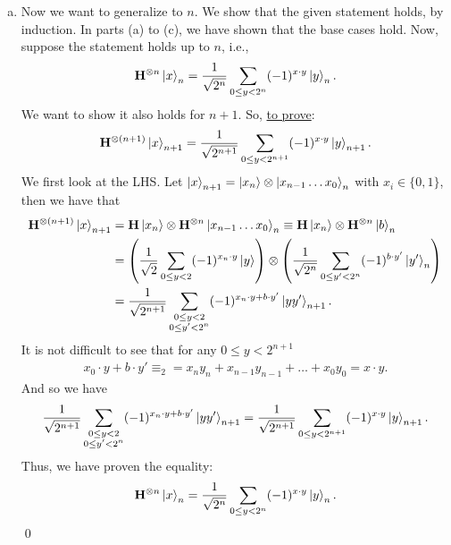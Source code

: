 \documentclass{book}
\theoremstyle{definition}
\newcommand{\nn}{\nonumber}
\newcommand{\f}[2]{\frac{#1}{#2}}
\newcommand{\lp}{\left(}
\newcommand{\rp}{\right)}
\newcommand{\had}{\mathbf{H}}
\begin{document}
\begin{enumerate}[(a)]
	
	
	\item Now we want to generalize to $n$. We show that the given statement holds, by induction. In parts (a) to (c), we have shown that the base cases hold. Now, suppose the statement holds up to $n$, i.e.,
	\begin{align}
	\had^{\otimes n}\ket{x}_n = \f{1}{\sqrt{2^n}} \sum_{0 \leq y < 2^n}(-1)^{x\cdot y}\ket{y}_n.
	\end{align}
	We want to show it also holds for $n+1$. So, \underline{to prove}:
	\begin{align}
	\had^{\otimes (n+1)}\ket{x}_{n+1} = \f{1}{\sqrt{2^{n+1}}} \sum_{0 \leq y < 2^{n+1}}(-1)^{x\cdot y}\ket{y}_{n+1}.
	\end{align}
	We first look at the LHS. Let $\ket{x}_{n+1} = \ket{x_n}\otimes \ket{x_{n-1}\dots x_0}_{n}$ with $x_i\in\{0,1\}$, then we have that
	\begin{align}
	\had^{\otimes (n+1)}\ket{x}_{n+1} &= \had \ket{x_n} \otimes \had^{\otimes n}\ket{x_{n-1}\dots x_0}_n \equiv \had \ket{x_n} \otimes \had^{\otimes n}\ket{b}_n \nn\\
	&= \lp \f{1}{\sqrt{2}}\sum_{0\leq y < 2}(-1)^{x_n\cdot y}\ket{y} \rp \otimes \lp \f{1}{\sqrt{2^n}} \sum_{0 \leq y' < 2^n}(-1)^{b\cdot y'}\ket{y'}_n \rp\nn\\
	&=  \f{1}{\sqrt{2^{n+1}}}\sum\limits_{\substack{0\leq y < 2\\0 \leq y' < 2^n}}   (-1)^{x_n\cdot y + b\cdot y'}\ket{yy'}_{n+1}.
	\end{align}
	It is not difficult to see that for any $0 \leq y < 2^{n+1}$
	\begin{align}
	x_0\cdot y + b\cdot y' \equiv_2 = x_ny_n + x_{n-1}y_{n-1} + \dots + x_0 y_0 = x\cdot y.
	\end{align}
	And so we have
	\begin{align}
	\f{1}{\sqrt{2^{n+1}}}\sum\limits_{\substack{0\leq y < 2\\0 \leq y' < 2^n}}   (-1)^{x_n\cdot y + b\cdot y'}\ket{yy'}_{n+1}= \f{1}{\sqrt{2^{n+1}}}\sum_{0 \leq y< 2^{n+1}}  (-1)^{x\cdot y}\ket{y}_{n+1}.
	\end{align}
	Thus, we have proven the equality:
	\begin{align}
	\had^{\otimes n}\ket{x}_n = \f{1}{\sqrt{2^n}} \sum_{0 \leq y < 2^n}(-1)^{x\cdot y}\ket{y}_n.
	\end{align}
	\qed
	
	
\end{enumerate}
\end{document}
